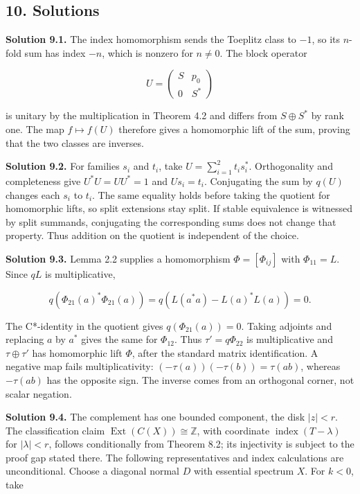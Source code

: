 \documentclass[
  11pt,
]{article}
\begin{document}
\subsection{10. Solutions}\label{solutions}

\textbf{Solution 9.1.} The index homomorphism sends the Toeplitz class
to \(-1\), so its \(n\)-fold sum has index \(-n\), which is nonzero for
\(n\ne0\). The block operator

\[
U=\begin{pmatrix}S&p_0\\0&S^*\end{pmatrix}
\]

is unitary by the multiplication in Theorem 4.2 and differs from
\(S\oplus S^*\) by rank one. The map \(f\mapsto f(U)\) therefore gives a
homomorphic lift of the sum, proving that the two classes are inverses.

\textbf{Solution 9.2.} For families \(s_i\) and \(t_i\), take
\(U=\sum_{i=1}^2t_is_i^*\). Orthogonality and completeness give
\(U^*U=UU^*=1\) and \(Us_i=t_i\). Conjugating the sum by \(q(U)\)
changes each \(s_i\) to \(t_i\). The same equality holds before taking
the quotient for homomorphic lifts, so split extensions stay split. If
stable equivalence is witnessed by split summands, conjugating the
corresponding sums does not change that property. Thus addition on the
quotient is independent of the choice.

\textbf{Solution 9.3.} Lemma 2.2 supplies a homomorphism
\(\Phi=[\Phi_{ij}]\) with \(\Phi_{11}=L\). Since \(qL\) is
multiplicative,

\[
q(\Phi_{21}(a)^*\Phi_{21}(a))
=q(L(a^*a)-L(a)^*L(a))=0.
\]

The C*-identity in the quotient gives \(q(\Phi_{21}(a))=0\). Taking
adjoints and replacing \(a\) by \(a^*\) gives the same for
\(\Phi_{12}\). Thus \(\tau'=q\Phi_{22}\) is multiplicative and
\(\tau\oplus\tau'\) has homomorphic lift \(\Phi\), after the standard
matrix identification. A negative map fails multiplicativity:
\((-\tau(a))(-\tau(b))=\tau(ab)\), whereas \(-\tau(ab)\) has the
opposite sign. The inverse comes from an orthogonal corner, not scalar
negation.

\textbf{Solution 9.4.} The complement has one bounded component, the
disk \(|z|<r\). The classification claim
\(\operatorname{Ext}(C(X))\cong\mathbb Z\), with coordinate
\(\operatorname{index}(T-\lambda)\) for \(|\lambda|<r\), follows
conditionally from Theorem 8.2; its injectivity is subject to the proof
gap stated there. The following representatives and index calculations
are unconditional. Choose a diagonal normal \(D\) with essential
spectrum \(X\). For \(k<0\), take
\end{document}
